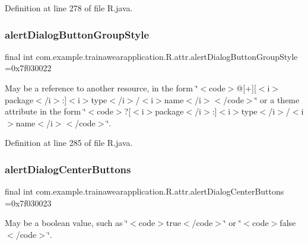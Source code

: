 Definition at line 278 of file R.\+java.

\mbox{\label{classcom_1_1example_1_1trainawearapplication_1_1_r_1_1attr_ac9c61feb1a5972c37e64aba37edeed64}} 
\subsubsection{\texorpdfstring{alertDialogButtonGroupStyle}{alertDialogButtonGroupStyle}}
{\footnotesize\ttfamily final int com.\+example.\+trainawearapplication.\+R.\+attr.\+alert\+Dialog\+Button\+Group\+Style =0x7f030022\hspace{0.3cm}{\ttfamily [static]}}

May be a reference to another resource, in the form \char`\"{}$<$code$>$@\mbox{[}+\mbox{]}\mbox{[}$<$i$>$package$<$/i$>$\+:\mbox{]}$<$i$>$type$<$/i$>$/$<$i$>$name$<$/i$>$$<$/code$>$\char`\"{} or a theme attribute in the form \char`\"{}$<$code$>$?\mbox{[}$<$i$>$package$<$/i$>$\+:\mbox{]}$<$i$>$type$<$/i$>$/$<$i$>$name$<$/i$>$$<$/code$>$\char`\"{}. 

Definition at line 285 of file R.\+java.

\mbox{\label{classcom_1_1example_1_1trainawearapplication_1_1_r_1_1attr_afb22bc3f111584aea687be4d832fddc8}} 
\subsubsection{\texorpdfstring{alertDialogCenterButtons}{alertDialogCenterButtons}}
{\footnotesize\ttfamily final int com.\+example.\+trainawearapplication.\+R.\+attr.\+alert\+Dialog\+Center\+Buttons =0x7f030023\hspace{0.3cm}{\ttfamily [static]}}

May be a boolean value, such as \char`\"{}$<$code$>$true$<$/code$>$\char`\"{} or \char`\"{}$<$code$>$false$<$/code$>$\char`\"{}. 

